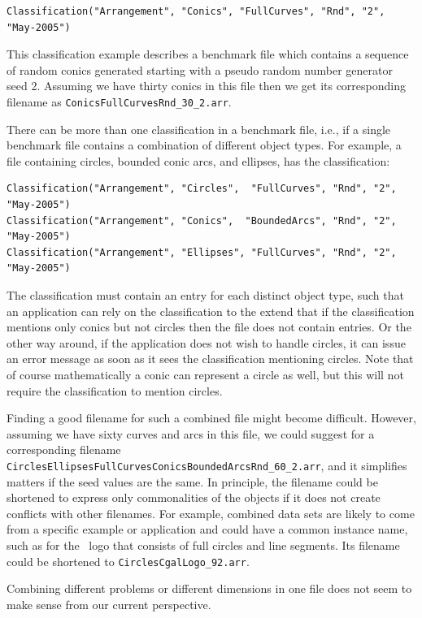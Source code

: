 \begin{verbatim}
Classification("Arrangement", "Conics", "FullCurves", "Rnd", "2", "May-2005")
\end{verbatim}

\noindent
This classification example describes a benchmark file which contains
a sequence of random conics generated starting with a pseudo random
number generator seed 2. Assuming we have thirty conics in this file
then we get its corresponding filename as
\texttt{ConicsFullCurvesRnd\_30\_2.arr}. 
  
There can be more than one classification in a benchmark file, i.e., if
a single benchmark file contains a combination of different object types.
For example, a file containing circles, bounded conic arcs, and
ellipses, has the classification:

\begin{verbatim}
Classification("Arrangement", "Circles",  "FullCurves", "Rnd", "2", "May-2005")
Classification("Arrangement", "Conics",  "BoundedArcs", "Rnd", "2", "May-2005")
Classification("Arrangement", "Ellipses", "FullCurves", "Rnd", "2", "May-2005")
\end{verbatim}

\noindent
The classification must contain an entry for each distinct object
type, such that an application can rely on the classification to the
extend that if the classification mentions only conics but not
circles then the file does not contain  entries. Or
the other way around, if the application does not wish to handle
circles, it can issue an error message as soon as it sees the
classification mentioning circles. Note that of course mathematically
a conic can represent a circle as well, but this will not require the
classification to mention circles.

Finding a good filename for such a combined file might become difficult.
However, assuming we have sixty curves and arcs in this file, we could
suggest for a corresponding filename
\texttt{CirclesEllipsesFullCurvesConicsBoundedArcsRnd\_60\_2.arr}, and
it simplifies matters if the seed values are the same. In principle,
the filename could be shortened to express only commonalities of the
objects if it does not create conflicts with other filenames. For
example, combined data sets are likely to come from a specific example
or application and could have a common instance name, such as
 for the \cgal\ logo that consists of full circles and
line segments. Its filename could be shortened to
\texttt{CirclesCgalLogo\_92.arr}.

Combining different problems or different dimensions in one file does
not seem to make sense from our current perspective.
